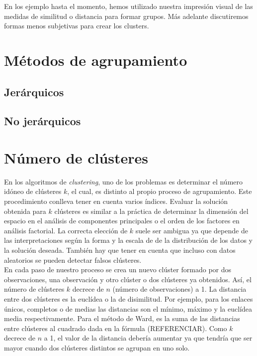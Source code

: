 \documentclass[a4paper, 20pt]{article}
\begin{document}
En los ejemplo hasta el momento, hemos utilizado nuestra impresión visual de las medidas de similitud o distancia para formar grupos. Más adelante discutiremos formas menos subjetivas para crear los clusters. 

\section{Métodos de agrupamiento}
\subsection{Jerárquicos}

\subsection{No jerárquicos}
\section{Número de clústeres}
En los algoritmos de \textit{clustering}, uno de los problemas es determinar el número idóneo de clústeres $ k $, el cual, es distinto al propio proceso de agrupamiento. Este procedimiento conlleva tener en cuenta varios índices. Evaluar la solución obtenida para $ k $ clústeres es similar a la práctica de determinar la dimensión del espacio en el análisis de componentes principales o el orden de los factores en análisis factorial.
La correcta elección de $ k $ suele ser ambigua ya que depende de las interpretaciones según la forma y la escala de de la distribución de los datos y la solución deseada. También hay que tener en cuenta que incluso con datos aleatorios se pueden detectar falsos clústeres. \\

En cada paso de nuestro proceso se crea un nuevo clúster formado por dos observaciones, una observación y otro clúster o dos clústeres ya obtenidos. Así, el número de clústeres $ k $ decrece de $ n $ (número de observaciones) a 1. La distancia entre dos clústeres es la euclídea o la de disimilitud. Por ejemplo, para los enlaces únicos, completos o de medias las distancias son el mínimo, máximo y la euclídea media respectivamente. Para el método de Ward, es la suma de las distancias entre clústeres al cuadrado dada en la fórmula (REFERENCIAR). Como $ k $ decrece de $ n $ a 1, el valor de la distancia debería aumentar ya que tendría que ser mayor cuando dos clústeres distintos se agrupan en uno solo. \\
\end{document}
